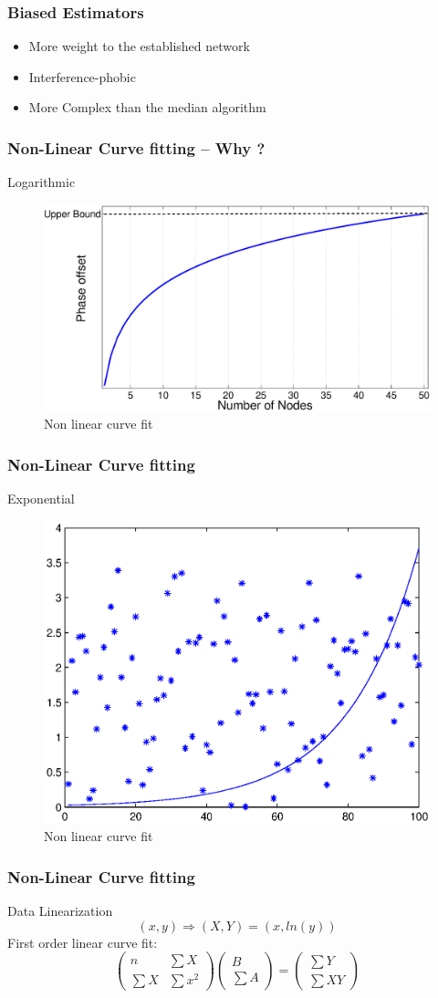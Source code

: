 \documentclass[t]{beamer}
\begin{document}
\begin{frame}
\frametitle{Biased Estimators}
\begin{itemize}
\item More weight to the established network \newline
\item Interference-phobic \newline
\item More Complex than the median algorithm \newline
\end{itemize}
\end{frame}
\begin{frame}
\frametitle{Non-Linear Curve fitting -- Why ?} Logarithmic
\begin{figure}
\centering
\includegraphics[width=0.5 \textwidth]{curvefit}
\caption{Non linear curve fit }
\end{figure}
\end{frame}
\begin{frame}
\frametitle{Non-Linear Curve fitting} Exponential
\begin{figure}
\centering
\includegraphics[width=0.5 \textwidth]{curvefit2}
\caption{Non linear curve fit }
\end{figure}
\end{frame}
\begin{frame}
\frametitle{Non-Linear Curve fitting} Data Linearization
\begin{equation}
(x,y) \Rightarrow (X,Y) = (x,ln(y))
\end{equation}
First order linear curve fit:
\begin{equation}
\begin{pmatrix}n & \sum X \\ \sum X & \sum {x^2} \end{pmatrix}
\begin{pmatrix}B \\ \sum A \end{pmatrix} =
\begin{pmatrix}\sum Y \\ \sum {XY} \end{pmatrix}
\end{equation}
\end{frame}
\end{document}
